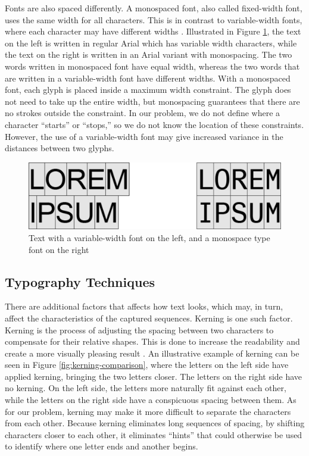 Fonts are also spaced differently. A monospaced font, also called fixed-width font, uses the same width for all characters. This is in contrast to variable-width fonts, where each character may have different widths \citep[pp.~8--11]{felici2011complete}. Illustrated in Figure \ref{fig:regular-mono-comparison}, the text on the left is written in regular Arial which has variable width characters, while the text on the right is written in an Arial variant with monospacing. The two words written in monospaced font have equal width, whereas the two words that are written in a variable-width font have different widths. With a monospaced font, each glyph is placed inside a maximum width constraint. The glyph does not need to take up the entire width, but monospacing guarantees that there are no strokes outside the constraint. In our problem, we do not define where a character ``starts'' or ``stops,'' so we do not know the location of these constraints. However, the use of a variable-width font may give increased variance in the distances between two glyphs.

\begin{figure}[h]
    \centering
    \captionsetup{justification=centering}
    \includegraphics[width=1.0\textwidth]{fig/chapter2/regular_mono_comparison.png}
    \caption{Text with a variable-width font on the left, and a monospace type font on the right}
    \label{fig:regular-mono-comparison}
\end{figure}

\subsection{Typography Techniques}
\label{sec:other_factors}
There are additional factors that affects how text looks, which may, in turn, affect the characteristics of the captured sequences. Kerning is one such factor. Kerning is the process of adjusting the spacing between two characters to compensate for their relative shapes. This is done to increase the readability and create a more visually pleasing result \citep[chapt.~11]{felici2011complete}. An illustrative example of kerning can be seen in Figure \ref{fig:kerning-comparison}, where the letters on the left side have applied kerning, bringing the two letters closer. The letters on the right side have no kerning. On the left side, the letters more naturally fit against each other, while the letters on the right side have a conspicuous spacing between them. As for our problem, kerning may make it more difficult to separate the characters from each other. Because kerning eliminates long sequences of spacing, by shifting characters closer to each other, it eliminates ``hints'' that could otherwise be used to identify where one letter ends and another begins.

